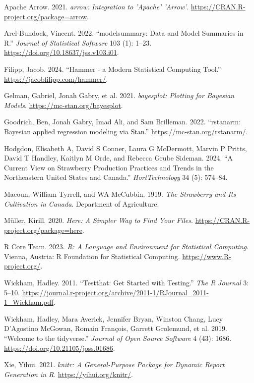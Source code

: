\documentclass[
  letterpaper,
  DIV=11,
  numbers=noendperiod]{scrartcl}
\newlength{\cslhangindent}
\newenvironment{CSLReferences}[2] %
 {\begin{list}{}{%
  \setlength{\itemindent}{0pt}
  \setlength{\leftmargin}{0pt}
  \setlength{\parsep}{0pt}
  \ifodd #1
   \setlength{\leftmargin}{\cslhangindent}
   \setlength{\itemindent}{-1\cslhangindent}
  \fi
  \setlength{\itemsep}{#2\baselineskip}}}
 {\end{list}}
\begin{document}
\label{refs}
\begin{CSLReferences}{1}{0}
Apache Arrow. 2021. \emph{{arrow: Integration to 'Apache' 'Arrow'}}.
\url{https://CRAN.R-project.org/package=arrow}.

Arel-Bundock, Vincent. 2022. {``{modelsummary}: Data and Model Summaries
in {R}.''} \emph{Journal of Statistical Software} 103 (1): 1--23.
\url{https://doi.org/10.18637/jss.v103.i01}.

Filipp, Jacob. 2024. {``Hammer - a Modern Statistical Computing Tool.''}
\url{https://jacobfilipp.com/hammer/}.

Gelman, Gabriel, Jonah Gabry, et al. 2021. \emph{{bayesplot: Plotting
for Bayesian Models}}. \url{https://mc-stan.org/bayesplot}.

Goodrich, Ben, Jonah Gabry, Imad Ali, and Sam Brilleman. 2022.
{``{rstanarm: {Bayesian} applied regression modeling via {Stan}}.''}
\url{https://mc-stan.org/rstanarm/}.

Hodgdon, Elisabeth A, David S Conner, Laura G McDermott, Marvin P
Pritts, David T Handley, Kaitlyn M Orde, and Rebecca Grube Sideman.
2024. {``A Current View on Strawberry Production Practices and Trends in
the Northeastern United States and Canada.''} \emph{HortTechnology} 34
(5): 574--84.

Macoun, William Tyrrell, and WA McCubbin. 1919. \emph{The Strawberry and
Its Cultivation in Canada}. Department of Agriculture.

Müller, Kirill. 2020. \emph{Here: A Simpler Way to Find Your Files}.
\url{https://CRAN.R-project.org/package=here}.

R Core Team. 2023. \emph{{R: A Language and Environment for Statistical
Computing}}. Vienna, Austria: R Foundation for Statistical Computing.
\url{https://www.R-project.org/}.

Wickham, Hadley. 2011. {``Testthat: Get Started with Testing.''}
\emph{The R Journal} 3: 5--10.
\url{https://journal.r-project.org/archive/2011-1/RJournal_2011-1_Wickham.pdf}.

Wickham, Hadley, Mara Averick, Jennifer Bryan, Winston Chang, Lucy
D'Agostino McGowan, Romain François, Garrett Grolemund, et al. 2019.
{``Welcome to the {tidyverse}.''} \emph{Journal of Open Source Software}
4 (43): 1686. \url{https://doi.org/10.21105/joss.01686}.

Xie, Yihui. 2021. \emph{{knitr: A General-Purpose Package for Dynamic
Report Generation in R}}. \url{https://yihui.org/knitr/}.

\end{CSLReferences}
\end{document}
